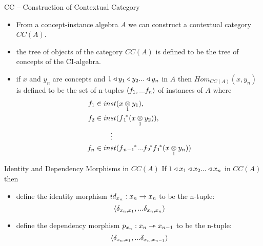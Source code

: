 \begin{frame}{CC -- Construction of Contextual Category}
\begin{itemize}
\item From a concept-instance algebra $A$ we can construct a contextual category $CC(A)$.
\item the tree of objects of the category $CC(A)$ is defined to be the tree of concepts of the CI-algebra.
\item if $x$ and $y_n$ are concepts and $1 \base y_1 \base y_2 ... \base y_n$ in $A$
then $Hom_{CC(A)}(x,y_n)$ is defined to be the set of n-tuples $\tuple{\fn}$ of instances of $A$ 
where 
\begin{align*}
f_1 \in in&st(\crossx{x}{y_1}{1}),                                 \\ 
f_2 \in in&st(\fonestar(\crossx{x}{y_2}{1})),                      \\
&\vdots                                                            \\
f_n \in in&st(\fnonestar...\ftwostar\fonestar(\crossx{x}{y_n}{1})) \\
\end{align*}
\end{itemize}
\end{frame}

\begin{frame}{Identity and Dependency Morphisms in $CC(A)$}
If $1 \base x_1 \base x_2 ... \base x_n$ in $CC(A)$
then 
\begin{itemize}
\item define the identity morphism $id_{x_n}:x_n \morph x_n$  
to be the n-tuple:
$$\tuple{\delta_{x_n,x_1},...\delta_{x_n,x_n}}$$
\item define the dependency morphism $p_{x_n}:x_n \smorph x_{n-1}$ to be the n-tuple:
$$\tuple{\delta_{x_n,x_1},...\delta_{x_n,x_{n-1}}}$$
\end{itemize}
\end{frame}


\iffalse{
\begin{frame}{Composition of morphisms}
Composition of morphisms is defined as follows.

$$\tuple{f_1,...f_n}\circ \tuple{g_1,...g_m} 
=\tuple{\fnvectorstar(\crossx{x}{g_1}{1}),...\fnvectorstar(\crossx{x}{g_m}{1})}
$$
\end{frame}
}\fi

